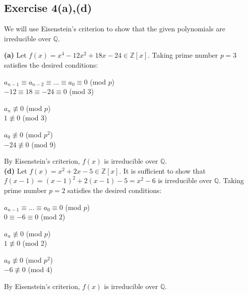 \subsection*{Exercise 4(a),(d)}
We will use Eisenstein's criterion to show that the given polynomials are irreducible over $\mathbb{Q}$.

\textbf{(a)} Let $f(x) = x^4 - 12x^2 + 18x - 24 \in \mathbb{Z}[x]$. Taking prime number $p=3$ satisfies the desired conditions: 

$a_{n-1} \equiv a_{n-2} \equiv ... \equiv a_0 \equiv 0$ (mod $p$) \\
$-12 \equiv 18 \equiv -24 \equiv 0$ (mod $3$)

$a_n \not\equiv 0$ (mod $p$) \\
$1 \not\equiv 0$ (mod 3)

$a_0 \not\equiv 0$ (mod $p^2$) \\
$-24 \not\equiv 0$ (mod 9)

By Eisenstein's criterion, $f(x)$ is irreducible over $\mathbb{Q}$. \\

\textbf{(d)} Let $f(x) = x^2 + 2x - 5 \in \mathbb{Z}[x]$. It is sufficient to show that $f(x-1) = (x-1)^2 + 2(x-1) - 5 = x^2 - 6$ is irreducible over $\mathbb{Q}$. Taking prime number $p = 2$ satisfies the desired conditions: 

$a_{n-1} \equiv ... \equiv a_0 \equiv 0$ (mod $p$) \\
$0 \equiv -6 \equiv 0$ (mod $2$)

$a_n \not\equiv 0$ (mod $p$) \\
$1 \not\equiv 0$ (mod 2)

$a_0 \not\equiv 0$ (mod $p^2$) \\
$-6 \not\equiv 0$ (mod 4)

By Eisenstein's criterion, $f(x)$ is irreducible over $\mathbb{Q}$.
